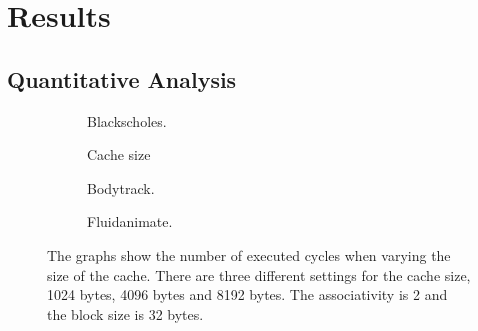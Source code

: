 \section{Results}

\subsection{Quantitative Analysis}




\begin{figure}[H]
    \centering
    \begin{subfigure}[b]{0.33\textwidth}
        \centering
        \caption{Blackscholes.}
        \label{fig:cache_size_blackscholes}
    \end{subfigure}%
    \hfill
    \begin{subfigure}[b]{0.33\textwidth}
        \centering
        Cache size\par\medskip
        \caption{Bodytrack.}
        \label{fig:cache_size_bodytrack}
    \end{subfigure}%
    \hfill
    \begin{subfigure}[b]{0.33\textwidth}
        \centering
        \caption{Fluidanimate.}
        \label{fig:cache_size_fluidanimate}
    \end{subfigure}
    \hfill
    \caption{The graphs show the number of executed cycles when varying the size of the cache. There are three different settings for the cache size, 1024 bytes, 4096 bytes and 8192 bytes. The associativity is 2 and the block size is 32 bytes.}
    \label{fig:cache_size}
\end{figure}


